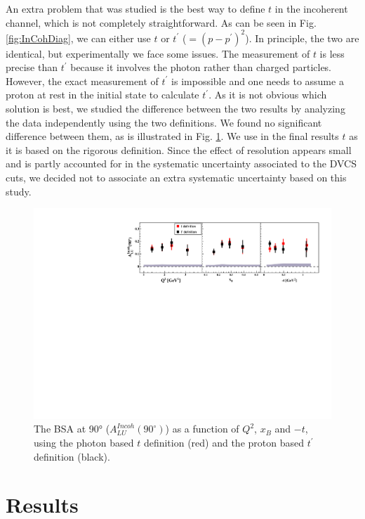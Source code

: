 \documentclass[aps,prc,preprint,superscriptaddress]{revtex4}
\begin{document}
An extra problem that was studied is the best way to define $t$ in the incoherent channel, 
which is not completely straightforward. As can be seen in Fig. \ref{fig:InCohDiag}, 
we can either use $t$ or $t^\prime$ ($= (p - p^\prime)^2$). In principle, the two are 
identical, but experimentally we face some issues. The measurement of $t$ is less precise than
$t^\prime$ because it involves the photon rather than charged particles. However, the 
exact measurement of $t^\prime$ is impossible and one needs to assume a proton at rest
in the initial state to calculate $t^\prime$. As it is not obvious which solution is best,
we studied the difference between the two results by analyzing the data independently using the two 
definitions. We found no significant difference between them, as is 
illustrated in Fig. \ref{fig:ttpComp}. We use in the final results $t$ as it is based on the 
rigorous definition. Since the effect of resolution appears small and is partly accounted for
in the systematic uncertainty associated to the DVCS cuts, we decided not to associate an extra
systematic uncertainty based on this study.

\begin{figure}[tbp!]
\center
\includegraphics[width=15cm]{t_tprime_ALU_90_p_shortscenrario.pdf}
	\caption{The BSA at 90° ($A_{LU}^{Incoh} (90^\circ)$) as a
	function of $Q^2$, $x_{B}$ and $-t$, using the photon based $t$ definition (red)
	and the proton based $t^\prime$ definition (black).}
\label{fig:ttpComp}
\end{figure}

\section{Results}
\end{document}
